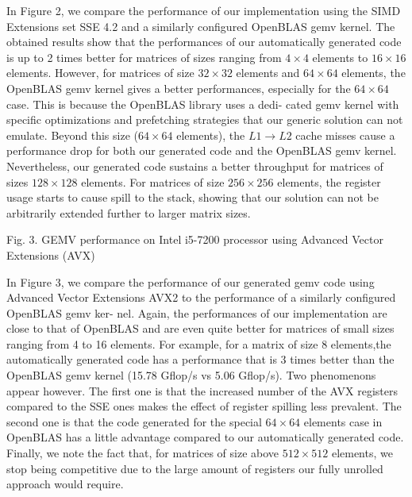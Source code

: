 \documentclass[../main]{subfiles}
\begin{document}
In Figure 2, we compare the performance of our implementation
using the SIMD Extensions set SSE 4.2 and a similarly
configured OpenBLAS gemv kernel. The obtained results show
that the performances of our automatically generated code is
up to 2 times better for matrices of sizes ranging from $4 \times 4$
elements to $16 \times 16$ elements. However, for matrices of size
$32 \times 32$ elements and $64 \times 64$ elements, the OpenBLAS gemv
kernel gives a better performances, especially for the $64 \times 64$
case. This is because the OpenBLAS library uses a dedi-
cated gemv kernel with specific optimizations and prefetching
strategies that our generic solution can not emulate. Beyond
this size ($64 \times 64$ elements), the $L1 \rightarrow L2$ cache misses
cause a performance drop for both our generated code and
the OpenBLAS gemv kernel. Nevertheless, our generated code
sustains a better throughput for matrices of sizes $128 \times 128$
elements. For matrices of size $256 \times 256$ elements, the register
usage starts to cause spill to the stack, showing that our
solution can not be arbitrarily extended further to larger matrix sizes.


Fig. 3. GEMV performance on Intel i5-7200 processor using Advanced Vector
Extensions (AVX)

In Figure 3, we compare the performance of our generated
gemv code using Advanced Vector Extensions AVX2 to the
performance of a similarly configured OpenBLAS gemv ker-
nel. Again, the performances of our implementation are close
to that of OpenBLAS and are even quite better for matrices of
small sizes ranging from 4 to 16 elements. For example, for a
matrix of size 8 elements,the automatically generated code has
a performance that is 3 times better than the OpenBLAS gemv
kernel (15.78 Gflop/s vs 5.06 Gflop/s). Two phenomenons
appear however. The first one is that the increased number
of the AVX registers compared to the SSE ones makes the
effect of register spilling less prevalent. The second one is
that the code generated for the special $64 \times 64$ elements
case\cite{hpcs23} in OpenBLAS has a little advantage compared to
our automatically generated code. Finally, we note the fact
that, for matrices of size above $512 \times 512$ elements, we stop
being competitive due to the large amount of registers our
fully unrolled approach would require.
\end{document}

